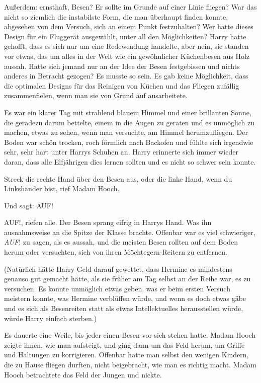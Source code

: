 Außerdem: ernsthaft, Besen? Er sollte im Grunde auf einer Linie fliegen? War das
nicht so ziemlich die instabilste Form, die man überhaupt finden konnte,
abgesehen von dem Versuch, sich an einem Punkt festzuhalten? Wer hatte dieses
Design für ein Fluggerät ausgewählt, unter all den Möglichkeiten? Harry hatte
gehofft, dass es sich nur um eine Redewendung handelte, aber nein, sie standen
vor etwas, das um alles in der Welt wie ein gewöhnlicher Küchenbesen aus Holz
aussah. Hatte sich jemand nur an der Idee der Besen festgebissen und nichts
anderes in Betracht gezogen? Es musste so sein. Es gab keine Möglichkeit, dass
die optimalen Designs für das Reinigen von Küchen und das Fliegen zufällig
zusammenfielen, wenn man sie von Grund auf ausarbeitete.

Es war ein klarer Tag mit strahlend blauem Himmel und einer brillanten Sonne,
die geradezu darum bettelte, einem in die Augen zu geraten und es unmöglich zu
machen, etwas zu sehen, wenn man versuchte, am Himmel herumzufliegen. Der Boden
war schön trocken, roch förmlich nach Backofen und fühlte sich irgendwie sehr,
sehr hart unter Harrys Schuhen an. Harry erinnerte sich immer wieder daran, dass
alle Elfjährigen dies lernen sollten und es nicht so schwer sein konnte.

\glqq Streck die rechte Hand über den Besen aus, oder die linke Hand, wenn du
Linkshänder bist\grqq{}, rief Madam Hooch.

\glqq Und sagt: AUF!\grqq{}

\glqq AUF!\grqq{}, riefen alle. Der Besen sprang eifrig in Harrys Hand. Was ihn
ausnahmsweise an die Spitze der Klasse brachte. Offenbar war es viel
schwieriger, \glqq \emph{AUF}!\grqq{} zu sagen, als es aussah, und die meisten
Besen rollten auf dem Boden herum oder versuchten, sich von ihren
Möchtegern-Reitern zu entfernen.

(Natürlich hätte Harry Geld darauf gewettet, dass Hermine es mindestens genauso
gut gemacht hätte, als sie früher am Tag selbst an der Reihe war, es zu
versuchen. Es konnte unmöglich etwas geben, was er beim ersten Versuch meistern
konnte, was Hermine verblüffen würde, und wenn es doch etwas gäbe und es sich
als Besenreiten statt als etwas Intellektuelles herausstellen würde, würde Harry
einfach sterben.)

Es dauerte eine Weile, bis jeder einen Besen vor sich stehen hatte. Madam Hooch
zeigte ihnen, wie man aufsteigt, und ging dann um das Feld herum, um Griffe und
Haltungen zu korrigieren. Offenbar hatte man selbst den wenigen Kindern, die zu
Hause fliegen durften, nicht beigebracht, wie man es richtig macht. Madam Hooch
betrachtete das Feld der Jungen und nickte.

